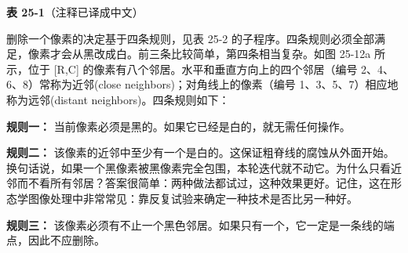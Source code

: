 \textbf{表 25-1}（注释已译成中文）

\begin{Shaded}
\begin{Highlighting}[]
\NormalTok{130 \textquotesingle{}}
\NormalTok{150 \textquotesingle{}}
\NormalTok{170 \textquotesingle{}}
\NormalTok{190 \textquotesingle{}}
\NormalTok{250 \textquotesingle{}}
\NormalTok{310 \textquotesingle{}}
\NormalTok{330 \textquotesingle{}}
\end{Highlighting}
\end{Shaded}

删除一个像素的决定基于四条规则，见表 25-2
的子程序。四条规则必须全部满足，像素才会从黑改成白。前三条比较简单，第四条相当复杂。如图
25-12a 所示，位于 {[}R,C{]}
的像素有八个邻居。水平和垂直方向上的四个邻居（编号
2、4、6、8）常称为近邻(close neighbors)；对角线上的像素（编号
1、3、5、7）相应地称为远邻(distant neighbors)。四条规则如下：

\textbf{规则一：} 当前像素必须是黑的。如果它已经是白的，就无需任何操作。

\textbf{规则二：}
该像素的近邻中至少有一个是白的。这保证粗脊线的腐蚀从外面开始。换句话说，如果一个黑像素被黑像素完全包围，本轮迭代就不动它。为什么只看近邻而不看所有邻居？答案很简单：两种做法都试过，这种效果更好。记住，这在形态学图像处理中非常常见：靠反复试验来确定一种技术是否比另一种好。

\textbf{规则三：}
该像素必须有不止一个黑色邻居。如果只有一个，它一定是一条线的端点，因此不应删除。

